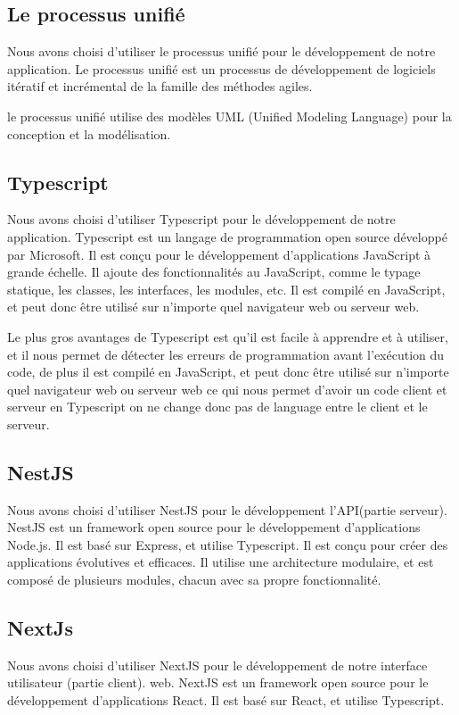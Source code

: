 \subsection{Le processus unifié}\label{subsec: conception-unified-process}
Nous avons choisi d'utiliser le processus unifié pour le développement de
notre application. Le processus unifié est un processus de développement de
logiciels itératif et incrémental de la famille des méthodes agiles.

le processus unifié utilise des modèles UML (Unified Modeling Language) pour la
conception et la modélisation.

\subsection{Typescript}\label{subsec: conception-typescript}
Nous avons choisi d'utiliser Typescript pour le développement de notre
application. Typescript est un langage de programmation open source développé
par Microsoft. Il est conçu pour le développement d'applications JavaScript
à grande échelle. Il ajoute des fonctionnalités au JavaScript, comme le typage
statique, les classes, les interfaces, les modules, etc. Il est compilé en
JavaScript, et peut donc être utilisé sur n'importe quel navigateur web ou
serveur web.

Le plus gros avantages de Typescript est qu'il est facile à apprendre et à
utiliser, et il nous permet de détecter les erreurs de programmation avant
l'exécution du code, de plus il est compilé en JavaScript, et peut donc être
utilisé sur n'importe quel navigateur web ou serveur web ce qui nous permet d'avoir un
code client et serveur en Typescript on ne change donc pas de language entre le
client et le serveur.

\subsection{NestJS}\label{subsec: conception-nestjs}
Nous avons choisi d'utiliser NestJS pour le développement l'API(partie serveur).
NestJS est un framework open source pour le développement d'applications
Node.js. Il est basé sur Express, et utilise Typescript. Il est conçu pour
créer des applications évolutives et efficaces. Il utilise une architecture
modulaire, et est composé de plusieurs modules, chacun avec sa propre
fonctionnalité.

\subsection{NextJs}\label{subsec: conception-nextjs}
Nous avons choisi d'utiliser NextJS pour le développement de notre interface utilisateur (partie client).
web. NextJS est un framework open source pour le développement d'applications
React. Il est basé sur React, et utilise Typescript.

